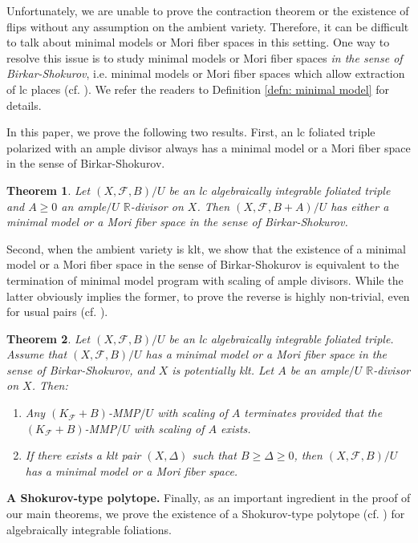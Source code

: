 \documentclass[11pt]{amsart}
\numberwithin{equation}{section}
\newcommand{\Rr}{\mathbb{R}}
\newcommand{\Ff}{\mathcal{F}}
\newtheorem{thm}{Theorem}[section]
\theoremstyle{definition}
\theoremstyle{definition}
\theoremstyle{definition}
\begin{document}
Unfortunately, we are unable to prove the contraction theorem or the existence of flips without any assumption on the ambient variety. Therefore, it can be difficult to talk about minimal models or Mori fiber spaces in this setting. One way to resolve this issue is to study minimal models or Mori fiber spaces \emph{in the sense of Birkar-Shokurov}, i.e. minimal models or Mori fiber spaces which allow extraction of lc places (cf. \cite{Sho96,Bir12}). We refer the readers to Definition \ref{defn: minimal model} for details.

In this paper, we prove the following two results. First, an lc foliated triple polarized with an ample divisor always has a minimal model or a Mori fiber space in the sense of Birkar-Shokurov. 

\begin{thm}\label{thm: eolmm+A} 
Let $(X,\Ff,B)/U$ be an lc algebraically integrable foliated triple and $A\geq 0$ an ample$/U$ $\Rr$-divisor on $X$. Then $(X,\Ff,B+A)/U$ has either a minimal model or a Mori fiber space in the sense of Birkar-Shokurov.
\end{thm}

Second, when the ambient variety is klt, we show that the existence of a minimal model or a Mori fiber space in the sense of Birkar-Shokurov is equivalent to the termination of minimal model program with scaling of ample divisors. While the latter obviously implies the former, to prove the reverse is highly non-trivial, even for usual pairs (cf. \cite[Theorem 1.9(3)]{Bir12}).

\begin{thm}\label{thm: foliation emm equal to tof scaling}
Let $(X,\Ff,B)/U$ be an lc algebraically integrable foliated triple. Assume that $(X,\Ff,B)/U$ has a minimal model or a Mori fiber space in the sense of Birkar-Shokurov, and $X$ is potentially klt. Let $A$ be an ample$/U$ $\Rr$-divisor on $X$. Then:
\begin{enumerate}
    \item Any $(K_{\Ff}+B)$-MMP$/U$ with scaling of $A$ terminates provided that the $(K_{\Ff}+B)$-MMP$/U$ with scaling of $A$ exists.
    \item If there exists a klt pair $(X,\Delta)$ such that $B\geq\Delta\geq 0$, then $(X,\Ff,B)/U$ has a minimal model or a Mori fiber space.
\end{enumerate}
\end{thm}

\medskip

\noindent\textbf{A Shokurov-type polytope.} Finally, as an important ingredient in the proof of our main theorems, we prove the existence of a Shokurov-type polytope (cf. \cite[Corollary 1.1.5]{BCHM10}) for algebraically integrable foliations.
\end{document}

